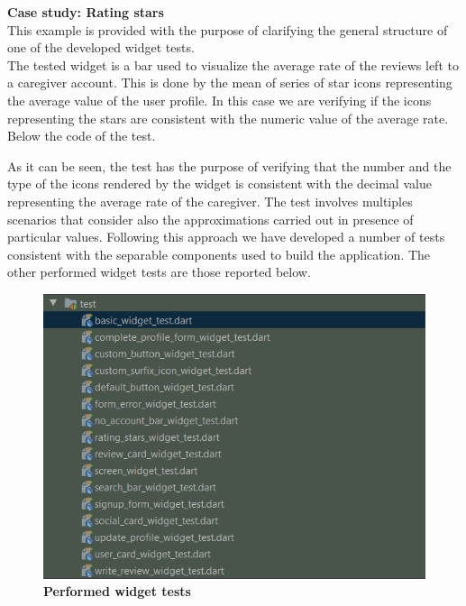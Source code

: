 \documentclass[../../dd.tex]{subfiles}
\begin{document}
	\textbf{Case study: Rating stars}\\
	This example is provided with the purpose of clarifying the general structure of one of the developed widget tests. \\
	The tested widget is a bar used to visualize the average rate of the reviews left to a caregiver account. This is done by the mean of series of star icons representing the average value of the user profile. In this case we are verifying if the icons representing the stars are consistent with the numeric value of the average rate.  Below the code of the test.

	\vspace{2 mm}
	
	\vspace{8 mm}

	As it can be seen, the test has the purpose of verifying that the number and the type of the icons rendered by the widget is consistent with the decimal value representing the average rate of the caregiver. The test involves multiples scenarios that consider also the approximations carried out in presence of particular values.
	Following this approach we have developed a number of tests consistent with the separable components used to build the application. The other performed widget tests are those reported below.

	\begin{figure}[H]
		\centering
		\includegraphics[scale=1.35]{../../assets/widget_tests.png}
		\caption{\textbf{Performed widget tests}}\label{fig:widget-tests}
	\end{figure}
\end{document}
